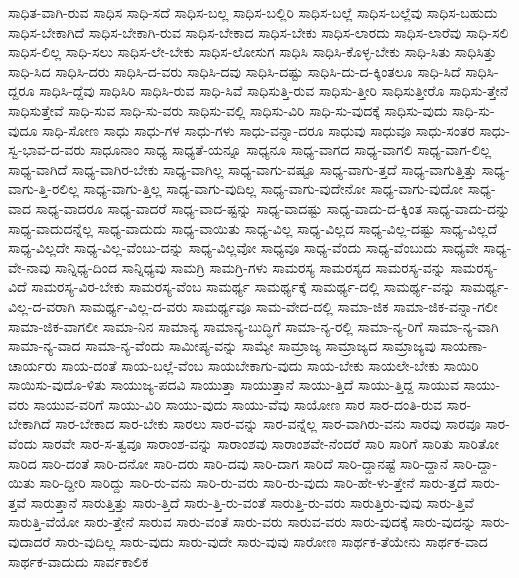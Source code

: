 {ಸಾಧಿತ-ವಾಗಿ-ರುವ
ಸಾಧಿಸ
ಸಾಧಿ-ಸದೆ
ಸಾಧಿಸ-ಬಲ್ಲ
ಸಾಧಿಸ-ಬಲ್ಲಿರಿ
ಸಾಧಿಸ-ಬಲ್ಲೆ
ಸಾಧಿಸ-ಬಲ್ಲೆವು
ಸಾಧಿಸ-ಬಹುದು
ಸಾಧಿಸ-ಬೇಕಾಗಿದೆ
ಸಾಧಿಸ-ಬೇಕಾಗಿ-ರುವ
ಸಾಧಿಸ-ಬೇಕಾದ
ಸಾಧಿಸ-ಬೇಕು
ಸಾಧಿಸ-ಲಾರದು
ಸಾಧಿಸ-ಲಾರೆವು
ಸಾಧಿ-ಸಲಿ
ಸಾಧಿಸ-ಲಿಲ್ಲ
ಸಾಧಿ-ಸಲು
ಸಾಧಿಸ-ಲೇ-ಬೇಕು
ಸಾಧಿಸ-ಲೋಸುಗ
ಸಾಧಿಸಿ
ಸಾಧಿಸಿ-ಕೊಳ್ಳ-ಬೇಕು
ಸಾಧಿ-ಸಿತು
ಸಾಧಿಸಿತ್ತು
ಸಾಧಿ-ಸಿದ
ಸಾಧಿಸಿ-ದರು
ಸಾಧಿಸಿ-ದ-ವರು
ಸಾಧಿಸಿ-ದವು
ಸಾಧಿಸಿ-ದಷ್ಟು
ಸಾಧಿಸಿ-ದು-ದ-ಕ್ಕಿಂತಲೂ
ಸಾಧಿ-ಸಿದೆ
ಸಾಧಿಸಿ-ದ್ದರೂ
ಸಾಧಿಸಿ-ದ್ದೆವು
ಸಾಧಿಸಿರಿ
ಸಾಧಿಸಿ-ರುವ
ಸಾಧಿ-ಸಿವೆ
ಸಾಧಿಸುತ್ತಿ-ರುವ
ಸಾಧಿಸು-ತ್ತೀರಿ
ಸಾಧಿಸುತ್ತೀರೊ
ಸಾಧಿಸು-ತ್ತೇನೆ
ಸಾಧಿಸುತ್ತೇವೆ
ಸಾಧಿ-ಸುವ
ಸಾಧಿ-ಸು-ವರು
ಸಾಧಿಸು-ವಲ್ಲಿ
ಸಾಧಿಸು-ವಿರಿ
ಸಾಧಿ-ಸು-ವುದಕ್ಕೆ
ಸಾಧಿಸು-ವುದು
ಸಾಧಿ-ಸು-ವುದೂ
ಸಾಧಿ-ಸೋಣ
ಸಾಧು
ಸಾಧು-ಗಳ
ಸಾಧು-ಗಳು
ಸಾಧು-ವನ್ನಾ-ದರೂ
ಸಾಧುವು
ಸಾಧುವೂ
ಸಾಧು-ಸಂತರ
ಸಾಧು-ಸ್ವ-ಭಾವ-ದ-ವರು
ಸಾಧೂನಾಂ
ಸಾಧ್ಯ
ಸಾಧ್ಯತೆ-ಯನ್ನೂ
ಸಾಧ್ಯನೂ
ಸಾಧ್ಯ-ವಾಗದ
ಸಾಧ್ಯ-ವಾಗಲಿ
ಸಾಧ್ಯ-ವಾಗ-ಲಿಲ್ಲ
ಸಾಧ್ಯ-ವಾಗಿದೆ
ಸಾಧ್ಯ-ವಾಗಿರ-ಬೇಕು
ಸಾಧ್ಯ-ವಾಗಿಲ್ಲ
ಸಾಧ್ಯ-ವಾಗು-ವಷ್ಟೂ
ಸಾಧ್ಯ-ವಾಗು-ತ್ತದೆ
ಸಾಧ್ಯ-ವಾಗುತ್ತಿತ್ತು
ಸಾಧ್ಯ-ವಾಗು-ತ್ತಿ-ರಲಿಲ್ಲ
ಸಾಧ್ಯ-ವಾಗು-ತ್ತಿಲ್ಲ
ಸಾಧ್ಯ-ವಾಗು-ವುದಿಲ್ಲ
ಸಾಧ್ಯ-ವಾಗು-ವುದೇನೋ
ಸಾಧ್ಯ-ವಾಗು-ವುದೋ
ಸಾಧ್ಯ-ವಾದ
ಸಾಧ್ಯ-ವಾದರೂ
ಸಾಧ್ಯ-ವಾದರೆ
ಸಾಧ್ಯ-ವಾದ-ಷ್ಟನ್ನು
ಸಾಧ್ಯ-ವಾದಷ್ಟು
ಸಾಧ್ಯ-ವಾದು-ದ-ಕ್ಕಿಂತ
ಸಾಧ್ಯ-ವಾದು-ದನ್ನು
ಸಾಧ್ಯ-ವಾದುದನ್ನೆಲ್ಲ
ಸಾಧ್ಯ-ವಾದುದು
ಸಾಧ್ಯ-ವಾಯಿತು
ಸಾಧ್ಯ-ವಿಲ್ಲ
ಸಾಧ್ಯ-ವಿಲ್ಲದ
ಸಾಧ್ಯ-ವಿಲ್ಲ-ದಷ್ಟು
ಸಾಧ್ಯ-ವಿಲ್ಲದೆ
ಸಾಧ್ಯ-ವಿಲ್ಲದೇ
ಸಾಧ್ಯ-ವಿಲ್ಲ-ವೆಂಬು-ದನ್ನು
ಸಾಧ್ಯ-ವಿಲ್ಲವೋ
ಸಾಧ್ಯವೂ
ಸಾಧ್ಯ-ವೆಂದು
ಸಾಧ್ಯ-ವೆಂಬುದು
ಸಾಧ್ಯವೇ
ಸಾಧ್ಯ-ವೇ-ನಾವು
ಸಾನ್ನಿಧ್ಯ-ದಿಂದ
ಸಾನ್ನಿಧ್ಯವು
ಸಾಮಗ್ರಿ
ಸಾಮಗ್ರಿ-ಗಳು
ಸಾಮರಸ್ಯ
ಸಾಮರಸ್ಯದ
ಸಾಮರಸ್ಯ-ವನ್ನು
ಸಾಮರಸ್ಯ-ವಿದೆ
ಸಾಮರಸ್ಯ-ವಿರ-ಬೇಕು
ಸಾಮರಸ್ಯ-ವೆಂಬ
ಸಾಮರ್ಥ್ಯ
ಸಾಮರ್ಥ್ಯಕ್ಕೆ
ಸಾಮರ್ಥ್ಯ-ದಲ್ಲಿ
ಸಾಮರ್ಥ್ಯ-ವನ್ನು
ಸಾಮರ್ಥ್ಯ-ವಿಲ್ಲ-ದ-ವರಾಗಿ
ಸಾಮರ್ಥ್ಯ-ವಿಲ್ಲ-ದ-ವರು
ಸಾಮರ್ಥ್ಯವೂ
ಸಾಮ-ವೇದ-ದಲ್ಲಿ
ಸಾಮಾ-ಜಿಕ
ಸಾಮಾ-ಜಿಕ-ವನ್ನಾ-ಗಲೀ
ಸಾಮಾ-ಜಿಕ-ವಾಗಲೀ
ಸಾಮಾ-ನಿನ
ಸಾಮಾನ್ಯ
ಸಾಮಾನ್ಯ-ಬುದ್ಧಿಗೆ
ಸಾಮಾ-ನ್ಯ-ರಲ್ಲಿ
ಸಾಮಾ-ನ್ಯ-ರಿಗೆ
ಸಾಮಾ-ನ್ಯ-ವಾಗಿ
ಸಾಮಾ-ನ್ಯ-ವಾದ
ಸಾಮಾ-ನ್ಯ-ವೆಂದು
ಸಾಮೀಪ್ಯ-ವನ್ನು
ಸಾಮ್ಯೇ
ಸಾಮ್ರಾಜ್ಯ
ಸಾಮ್ರಾಜ್ಯದ
ಸಾಮ್ರಾಜ್ಯವು
ಸಾಯಣಾ-ಚಾರ್ಯರು
ಸಾಯ-ದಂತೆ
ಸಾಯ-ಬಲ್ಲೆ-ವೆಂಬ
ಸಾಯಬೇಕಾಗು-ವುದು
ಸಾಯ-ಬೇಕು
ಸಾಯಲೇ-ಬೇಕು
ಸಾಯಿರಿ
ಸಾಯಿಸು-ವುದೊ-ಳಿತು
ಸಾಯುಜ್ಯ-ಪದವಿ
ಸಾಯುತ್ತಾ
ಸಾಯುತ್ತಾನೆ
ಸಾಯು-ತ್ತಿದೆ
ಸಾಯು-ತ್ತಿದ್ದ
ಸಾಯುವ
ಸಾಯು-ವರು
ಸಾಯುವ-ವರಿಗೆ
ಸಾಯು-ವಿರಿ
ಸಾಯು-ವುದು
ಸಾಯು-ವೆವು
ಸಾಯೋಣ
ಸಾರ
ಸಾರ-ದಂತಿ-ರುವ
ಸಾರ-ಬೇಕಾಗಿದೆ
ಸಾರ-ಬೇಕಾದ
ಸಾರ-ಬೇಕು
ಸಾರಲು
ಸಾರ-ವನ್ನು
ಸಾರ-ವನ್ನೆಲ್ಲ
ಸಾರ-ವಾಗಿರು-ವನು
ಸಾರವು
ಸಾರವೂ
ಸಾರ-ವೆಂದು
ಸಾರವೇ
ಸಾರ-ಸ-ತ್ವವೂ
ಸಾರಾಂಶ-ವನ್ನು
ಸಾರಾಂಶವು
ಸಾರಾಂಶವೇ-ನೆಂದರೆ
ಸಾರಿ
ಸಾರಿಗೆ
ಸಾರಿತು
ಸಾರಿತೋ
ಸಾರಿದ
ಸಾರಿ-ದಂತೆ
ಸಾರಿ-ದನೋ
ಸಾರಿ-ದರು
ಸಾರಿ-ದವು
ಸಾರಿ-ದಾಗ
ಸಾರಿದೆ
ಸಾರಿ-ದ್ದಾನಷ್ಟೆ
ಸಾರಿ-ದ್ದಾನೆ
ಸಾರಿ-ದ್ದಾ-ಯಿತು
ಸಾರಿ-ದ್ದೀರಿ
ಸಾರಿದ್ದು
ಸಾರಿ-ರು-ವನು
ಸಾರಿ-ರು-ವರು
ಸಾರಿ-ರು-ವುದು
ಸಾರಿ-ಹೇ-ಳು-ತ್ತೇನೆ
ಸಾರು-ತ್ತದೆ
ಸಾರು-ತ್ತವೆ
ಸಾರುತ್ತಾನೆ
ಸಾರುತ್ತಿತ್ತು
ಸಾರು-ತ್ತಿದೆ
ಸಾರು-ತ್ತಿ-ರು-ವಂತೆ
ಸಾರುತ್ತಿ-ರು-ವರು
ಸಾರುತ್ತಿರು-ವುವು
ಸಾರು-ತ್ತಿವೆ
ಸಾರುತ್ತಿ-ವೆಯೋ
ಸಾರು-ತ್ತೇನೆ
ಸಾರುವ
ಸಾರು-ವಂತೆ
ಸಾರು-ವರು
ಸಾರುವ-ವರು
ಸಾರು-ವುದಕ್ಕೆ
ಸಾರು-ವುದನ್ನು
ಸಾರು-ವುದಾದರೆ
ಸಾರು-ವುದಿಲ್ಲ
ಸಾರು-ವುದು
ಸಾರು-ವುದೇ
ಸಾರು-ವುವು
ಸಾರೋಣ
ಸಾರ್ಥಕ-ತೆಯೇನು
ಸಾರ್ಥಕ-ವಾದ
ಸಾರ್ಥಕ-ವಾದುದು
ಸಾರ್ವಕಾಲಿಕ
}
